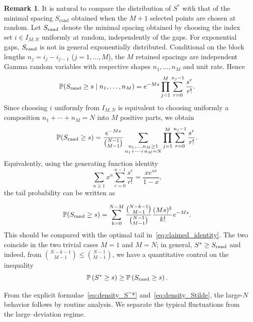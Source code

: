 \documentclass[a4paper,reqno,11pt]{amsart}
\numberwithin{equation}{section}
\def\PP{{\mathbb P}}
\numberwithin{thm}{section}
\theoremstyle{plain}
\theoremstyle{definition}
\newtheorem{rem}[thm]{Remark}
\begin{document}
{\begin{rem}
It is natural to compare the distribution of $S^*$ with that of the minimal spacing $S_\mathrm{rand}$  
obtained when the $M+1$ selected points are chosen at random. Let $S_{\rm rand}$ denote the minimal spacing obtained by choosing the
index set $i\in I_{M,N}$ uniformly at random, independently of the gaps.
For exponential gaps, $S_{\rm rand}$ is not in general exponentially
distributed. Conditional on the block lengths
$
    n_j=i_j-i_{j-1}$ ($j=1,\ldots,M$),
the $M$ retained spacings are independent Gamma random variables with
respective shapes $n_1,\ldots,n_M$ and unit rate. Hence
\begin{equation}
    \PP(S_{\rm rand}\geq s\mid n_1,\ldots,n_M)
    =
    e^{-Ms}\prod_{j=1}^M
    \sum_{r=0}^{n_j-1}\frac{s^r}{r!} .
\end{equation}
Since choosing $i$ uniformly from $I_{M,N}$ is equivalent to choosing uniformly
a composition $n_1+\cdots+n_M=N$ into $M$ positive parts, we obtain
\begin{equation}
\label{eq:Srand-tail-compositions}
    \PP(S_{\rm rand}\geq s)
    =
    \frac{e^{-Ms}}{\binom{N-1}{M-1}} \sum_{\substack{n_1,\ldots,n_M\geq1\\ n_1+\cdots+n_M=N}}
    \prod_{j=1}^M
    \sum_{r=0}^{n_j-1}\frac{s^r}{r!} .
\end{equation}
Equivalently, using the generating function identity
\begin{equation}
    \sum_{n\geq1} x^n\sum_{r=0}^{n-1}\frac{s^r}{r!}
    =
    \frac{x e^{sx}}{1-x} ,
\end{equation}
the tail probability can be written as

\begin{equation}
\label{eq:Srand-tail}
    \PP(S_{\rm rand}\geq s)
    =
    \sum_{k=0}^{N-M}
   \frac{\binom{N-k-1}{M-1}}{\binom{N-1}{M-1}}
    \frac{(Ms)^k}{k!}e^{-Ms}.
\end{equation}
This should be compared with the optimal tail in~\eqref{eq:claimed_identity}.
The two coincide in the two trivial cases $M=1$ and $M=N$; in general, $S^*\geq S_{\rm rand}$ and indeed, from $\binom{N-k-1}{M-1}\leq \binom{N-1}{M-1}$, we have a quantitative control on the inequality
\begin{equation}
   \PP\left(S^*\geq s\right)\geq  \PP\left(S_{\rm rand}\geq s\right).   
\end{equation}
\end{rem}




From the explicit formulae~\eqref{eq:density_S^*} and~\eqref{eq:density_Stilde}, the large-$N$ behavior follows by routine
analysis. We separate the typical  fluctuations from the
large–deviation regime. 
}
\end{document}
